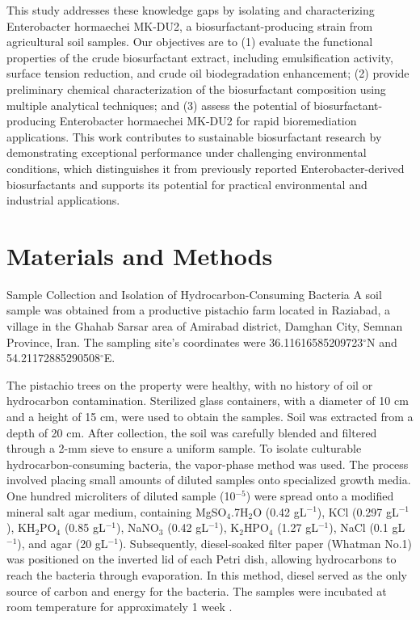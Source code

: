 \documentclass{svjour3}
\begin{document}
This study addresses these knowledge gaps by isolating and characterizing Enterobacter hormaechei MK-DU2, a biosurfactant-producing strain from agricultural soil samples. Our objectives are to (1) evaluate the functional properties of the crude biosurfactant extract, including emulsification activity, surface tension reduction, and crude oil biodegradation enhancement; (2) provide preliminary chemical characterization of the biosurfactant composition using multiple analytical techniques; and (3) assess the potential of biosurfactant-producing Enterobacter hormaechei MK-DU2 for rapid bioremediation applications. This work contributes to sustainable biosurfactant research by demonstrating exceptional performance under challenging environmental conditions, which distinguishes it from previously reported Enterobacter-derived biosurfactants and supports its potential for practical environmental and industrial applications.
\section{Materials and Methods}
Sample Collection and Isolation of Hydrocarbon-Consuming Bacteria
A soil sample was obtained from a productive pistachio farm located in Raziabad, a village in the Ghahab Sarsar area of Amirabad district, Damghan City, Semnan Province, Iran. The sampling site’s coordinates were 36.11616585209723$^\circ$N and 54.21172885290508$^\circ$E.

The pistachio trees on the property were healthy, with no history of oil or hydrocarbon contamination. Sterilized glass containers, with a diameter of 10 cm and a height of 15 cm, were used to obtain the samples. Soil was extracted from a depth of 20 cm. After collection, the soil was carefully blended and filtered through a 2-mm sieve to ensure a uniform sample. To isolate culturable hydrocarbon-consuming bacteria, the vapor-phase method was used. The process involved placing small amounts of diluted samples onto specialized growth media. One hundred microliters of diluted sample (10$^{-5}$) were spread onto a modified mineral salt agar medium, containing MgSO$_4$.7H$_2$O (0.42 gL$^{-1}$), KCl (0.297 gL$^{-1}$), KH$_2$PO$_4$ (0.85 gL$^{-1}$), NaNO$_3$ (0.42 gL$^{-1}$), K$_2$HPO$_4$ (1.27 gL$^{-1}$), NaCl (0.1 gL$^{-1}$), and agar (20 gL$^{-1}$). Subsequently, diesel-soaked filter paper (Whatman No.1) was positioned on the inverted lid of each Petri dish, allowing hydrocarbons to reach the bacteria through evaporation. In this method, diesel served as the only source of carbon and energy for the bacteria. The samples were incubated at room temperature for approximately 1 week \cite{18, 19}.
\end{document}
